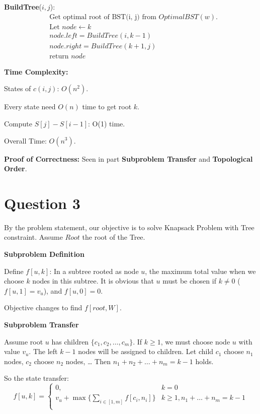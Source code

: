 \documentclass[11pt]{article}
\begin{document}
\textbf{BuildTree}($i, j$): 
\begin{align*}
    & \text{Get optimal root of BST(i, j) from } OptimalBST(w). \\
    & \text{Let }node \gets k \\
    & node.left = BuildTree(i, k-1) \\
    & node.right = BuildTree(k+1, j) \\
    & \text{return } node 
\end{align*}

\textbf{Time Complexity: }

\qquad States of $c(i, j)$: $O(n^2)$. 

\qquad Every state need $O(n)$ time to get root $k$. 

\qquad Compute $S[j]-S[i-1]$: O(1) time. 

\qquad Overall Time: $O(n^3)$. 

\textbf{Proof of Correctness: }Seen in part \textbf{Subproblem Transfer } and \textbf{Topological Order}. 

\newpage

\section*{Question 3}
By the problem statement, our objective is to solve Knapsack Problem with Tree constraint. 
Assume $Root$ the root of the Tree. 

\textbf{Subproblem Definition}

\qquad Define $f[u, k]$: In a subtree rooted as node $u$, the maximum total value when we choose $k$ nodes in this subtree.  
It is obvious that $u$ must be chosen if $k \neq 0$ ($f[u, 1]=v_u$), and $f[u, 0] = 0$. 

\qquad Objective changes to find $f[root, W]$.

\textbf{Subproblem Transfer}

\qquad Assume root $u$ has children $\{c_1, c_2, \dots, c_m\}$. If $k \ge 1$, we must choose node $u$ with value $v_u$. 
The left $k-1$ nodes will be assigned to children. Let child $c_1$ choose $n_1$ nodes, $c_2$ choose $n_2$ nodes, \dots 
Then $n_1 + n_2 + \dots + n_m = k-1$ holds. 

\qquad So the state transfer: \[f[u, k] = \begin{cases}
    0, & k = 0 \\
    v_u+ \max \{\sum_{i \in [1,m]}f[c_i, n_i]\} & k \ge 1, n_1 + \dots + n_m = k - 1 \\
\end{cases}\]
\end{document}
